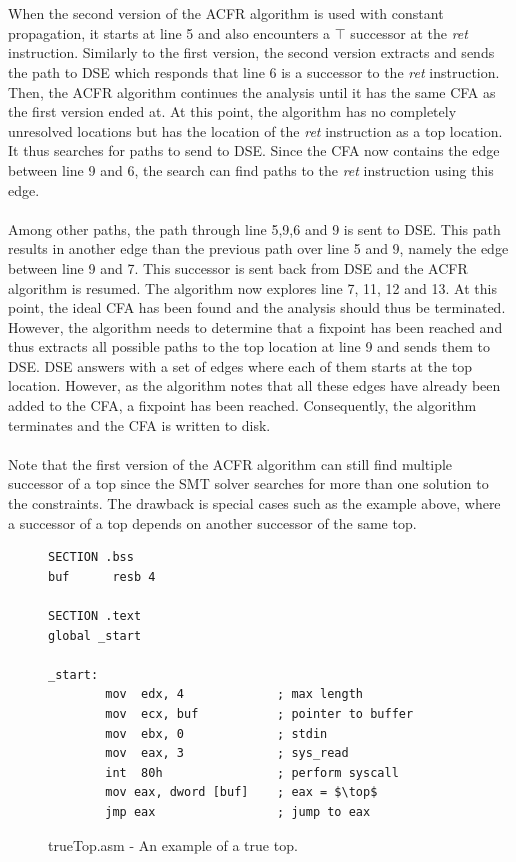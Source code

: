 \documentclass{kththesis}
\renewcommand{\it}[1]{\textit{#1}}
\begin{document}
\\ \\
When the second version of the ACFR algorithm is used with constant propagation, it starts at line 5 and also encounters a $\top$ successor at the \it{ret} instruction. Similarly to the first version, the second version extracts and sends the path to DSE which responds that line 6 is a successor to the \it{ret} instruction. Then, the ACFR algorithm continues the analysis until it has the same CFA as the first version ended at. At this point, the algorithm has no completely unresolved locations but has the location of the \it{ret} instruction as a top location. It thus searches for paths to send to DSE. Since the CFA now contains the edge between line 9 and 6, the search can find paths to the \it{ret} instruction using this edge.
\\ \\
Among other paths, the path through line 5,9,6 and 9 is sent to DSE. This path results in another edge than the previous path over line 5 and 9, namely the edge between line 9 and 7. This successor is sent back from DSE and the ACFR algorithm is resumed. The algorithm now explores line 7, 11, 12 and 13. At this point, the ideal CFA has been found and the analysis should thus be terminated. However, the algorithm needs to determine that a fixpoint has been reached and thus extracts all possible paths to the top location at line 9 and sends them to DSE. DSE answers with a set of edges where each of them starts at the top location. However, as the algorithm notes that all these edges have already been added to the CFA, a fixpoint has been reached. Consequently, the algorithm terminates and the CFA is written to disk. 
\\ \\
Note that the first version of the ACFR algorithm can still find multiple successor of a top since the SMT solver searches for more than one solution to the constraints. The drawback is special cases such as the example above, where a successor of a top depends on another successor of the same top.
\begin{figure}[ht]
    \centering
\begin{tcolorbox}
\begin{verbatim}
SECTION .bss
buf      resb 4

SECTION .text
global _start

_start:
        mov  edx, 4             ; max length
        mov  ecx, buf           ; pointer to buffer
        mov  ebx, 0             ; stdin
        mov  eax, 3             ; sys_read
        int  80h                ; perform syscall
        mov eax, dword [buf]    ; eax = $\top$
        jmp eax                 ; jump to eax
\end{verbatim}
\end{tcolorbox}
\caption{trueTop.asm - An example of a true top.}
    \label{fig:trueTop.asm}
\end{figure}
\end{document}
